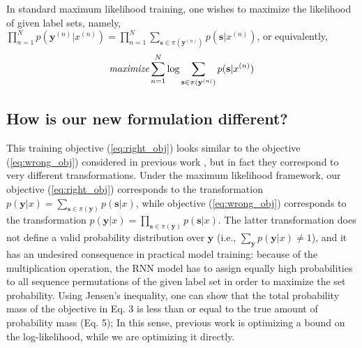   
  In standard maximum likelihood training, one wishes to maximize the likelihood of given label sets, namely, $\prod_{n=1}^N p(\mathbf{y}^{(n)}|x^{(n)})=\prod_{n=1}^N \sum_{\mathbf{s}\in \pi(\mathbf{y}^{(n)})} p(\mathbf{s}|x^{(n)})$, or equivalently, 
\begin{align}
\textit{maximize} \sum_{n=1}^N \log \sum_{\mathbf{s}\in \pi(\mathbf{y}^{(n)})} p(\mathbf{s}|x^{(n)})
\label{eq:right_obj}
\end{align}




\subsection{How is our new formulation different?}

This training objective (\ref{eq:right_obj}) looks similar to the objective (\ref{eq:wrong_obj}) considered in previous work \cite{vinyals2015order}, but in fact they correspond to very different transformations. Under the maximum likelihood framework, our objective (\ref{eq:right_obj}) corresponds to the transformation $p(\mathbf{y}|x)=\sum_{\mathbf{s}\in \pi(\mathbf{y})} p(\mathbf{s}|x)$, while objective (\ref{eq:wrong_obj}) corresponds to the transformation $p(\mathbf{y}|x)=\prod_{\mathbf{s}\in \pi(\mathbf{y})} p(\mathbf{s}|x)$. The latter transformation does not define a valid probability distribution over $\mathbf{y}$ (i.e., $\sum_{\mathbf{y}} p(\mathbf{y}|x)\neq 1$), and it has an undesired  consequence in practical model training: because of the multiplication operation, the RNN model has to assign equally high probabilities to all sequence permutations of the given label set in order to maximize the set probability. 
Using Jensen’s inequality, one can show that the total probability mass of the objective in Eq. 3 is less than or equal to the true amount of probability mass (Eq. 5); In this sense, previous work is optimizing a bound on the log-likelihood, while we are optimizing it directly. 

